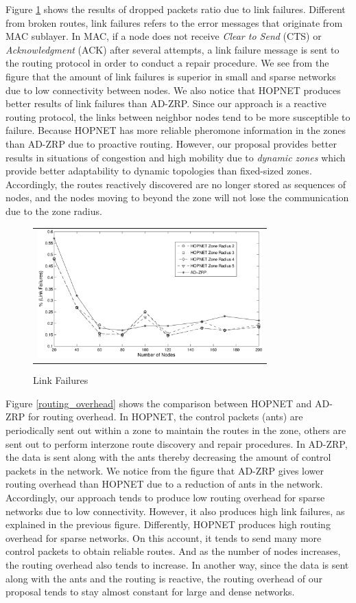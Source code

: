 \documentclass[conference]{IEEEtran}
\begin{document}
Figure \ref{link_failures} shows the results of dropped packets ratio due to link failures.
Different from broken routes, link failures refers to the error messages that originate from MAC sublayer.
In MAC, if a node does not receive \emph{Clear to Send} (CTS) or \emph{Acknowledgment} (ACK) after several attempts, a link failure message is sent to the routing protocol in order to conduct a repair procedure.
We see from the figure that the amount of link failures is superior in small and sparse networks due to low connectivity between nodes.
We also notice that HOPNET produces better results of link failures than AD-ZRP.
Since our approach is a reactive routing protocol, the links between neighbor nodes tend to be more susceptible to failure.
Because HOPNET has more reliable pheromone information in the zones than AD-ZRP due to proactive routing.
However, our proposal provides better results in situations of congestion and high mobility due to \emph{dynamic zones} which provide better adaptability to dynamic topologies than fixed-sized zones.
Accordingly, the routes reactively discovered are no longer stored as sequences of nodes, and the nodes moving to beyond the zone will not lose the communication due to the zone radius.

\begin{figure}[htb]
\begin{tabular}{c}
\includegraphics[width=245pt]{fig/link_failures.pdf}
\end{tabular}
\caption{Link Failures}
\label{link_failures}
\end{figure}

Figure \ref{routing_overhead} shows the comparison between HOPNET and AD-ZRP for routing overhead.
In HOPNET, the control packets (ants) are periodically sent out within a zone to maintain the routes in the zone, others are sent out to perform interzone route discovery and repair procedures.
In AD-ZRP, the data is sent along with the ants thereby decreasing the amount of control packets in the network.
We notice from the figure that AD-ZRP gives lower routing overhead than HOPNET due to a reduction of ants in the network.
Accordingly, our approach tends to produce low routing overhead for sparse networks due to low connectivity.
However, it also produces high link failures, as explained in the previous figure.
Differently, HOPNET produces high routing overhead for sparse networks.
On this account, it tends to send many more control packets to obtain reliable routes.
And as the number of nodes increases, the routing overhead also tends to increase.
In another way, since the data is sent along with the ants and the routing is reactive, the routing overhead of our proposal tends to stay almost constant for large and dense networks.
\end{document}
